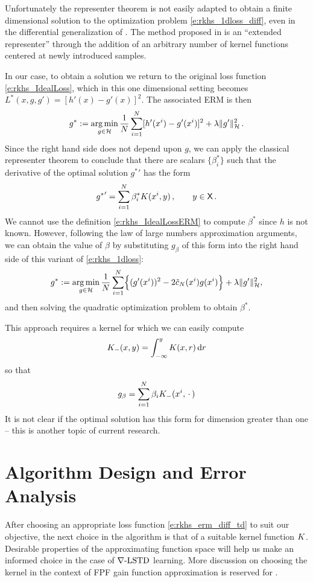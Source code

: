 Unfortunately the representer theorem is not easily adapted to obtain a finite dimensional solution to  the optimization problem \eqref{e:rkhs_1dloss_diff},  even in the differential generalization of  \cite{zho08}. The method proposed in \cite{bhujlaugil} is an ``extended representer'' through the addition of an arbitrary number of kernel functions centered at newly introduced samples.

In our case, to obtain a solution we return to the original loss function \eqref{e:rkhs_IdealLoss}, which in this one dimensional setting becomes $L^*(x,g,g') = [h'(x) - g'(x)]^2$.    The associated ERM is then
\begin{equation}
g^* := \argmin_{g\in\clH} \frac{1}{N} \sum_{i=1}^N [h'(x^i) - g'(x^i)]^2 + \lambda \|g'\|^2_\clH \, .
\label{e:rkhs_IdealLossERM}
\end{equation}
Since the right hand side does not depend upon $g$, we can apply the classical representer theorem to conclude that there are scalars $\{\beta^*_i\}$ such that the derivative of the optimal solution ${g^*}'$ has the form  
\[
{g^*}'  = \sum_{i=1}^N  \beta_i^* K(x^i,y) \,,  \qquad y \in {\sf X} \, .
\]
We cannot use the definition \eqref{e:rkhs_IdealLossERM} to compute $\beta^*$ since $h$ is not known.   However,  following the law of large numbers approximation arguments, we can obtain the value of $\beta$  by substituting $g_\beta$ of this form into the right hand side  of this variant of \eqref{e:rkhs_1dloss}: 
\begin{equation*}
g^* := \argmin_{g\in\clH} \frac{1}{N} \sum_{i=1}^N \Bigl\{ (g'(x^i))^2 - 2 \tilc_N(x^i) g(x^i) \Bigr\} + \lambda \|g'\|^2_\clH,
\label{e:rkhs_1dlossDiff}
\end{equation*}
and then solving the quadratic optimization problem to obtain $\beta^*$.

This approach requires a kernel   for which we can easily compute
\[
K_-(x,y) = \int_{-\infty}^y  K(x,r)\,  \text{d} r
\]
so that
\[
g_\beta =  \sum_{i=1}^N \beta_i  K_-(x^i,\,\cdot\,)
\]
It is not clear if the optimal solution has this form for dimension greater than one -- this is another topic of current research.


\section{Algorithm Design and Error Analysis}
\label{s:error_analysis}
After choosing an appropriate loss function \eqref{e:rkhs_erm_diff_td} to suit our objective, the next choice in the algorithm is that of a suitable kernel function $K$. Desirable properties of the approximating function space will help us make an informed choice in the case of $\nabla\text{-LSTD}$ learning. More discussion on choosing the kernel in the context of FPF gain function approximation is reserved for . 


